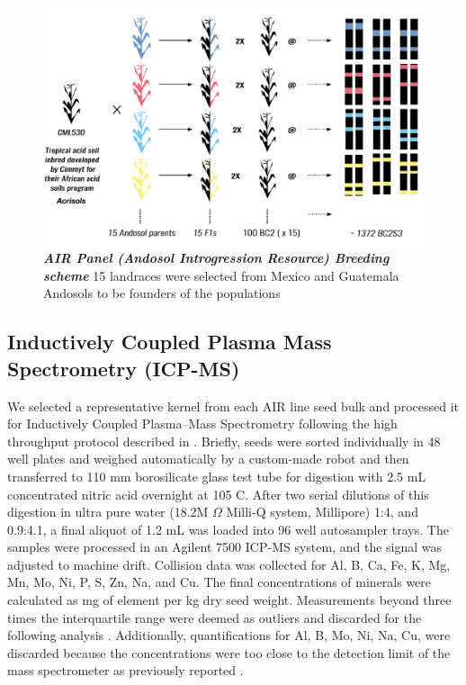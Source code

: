 \begin{figure}[!ht]
\includegraphics[width=\linewidth]{Chapter-4/figs/AIR_design.png}
\caption[ AIR Panel (Andosol Introgression Resource) Breeding scheme]
{\textit{{\textbf{AIR Panel (Andosol Introgression Resource) Breeding scheme}}}
15 landraces were selected from Mexico and Guatemala Andosols to be founders of the populations}
\label{fig::airdesign}
\end{figure}


\subsection{Inductively Coupled Plasma Mass Spectrometry (ICP-MS)}
We selected a representative kernel from each AIR line seed bulk and 
processed it for Inductively Coupled Plasma–Mass Spectrometry following the high throughput protocol described in \citep{baxter2014}.
Briefly, seeds were sorted individually in 48 well plates and weighed automatically by a custom-made robot and then transferred to 110 mm borosilicate glass test tube for digestion with 2.5 mL concentrated nitric acid overnight at 105 \textdegree C. 
After two serial dilutions of this digestion in ultra pure water (18.2M $\Omega$  Milli-Q system, Millipore) 1:4, and 0.9:4.1, a final aliquot of 1.2 mL was loaded into 96 well autosampler trays.
The samples were processed in an Agilent 7500 ICP-MS system, and the signal was adjusted to machine drift.
Collision data was collected for Al, B, Ca, Fe, K, Mg, Mn, Mo, Ni, P, S, Zn, Na, and Cu. 
The final concentrations of minerals were calculated as mg of element per kg dry seed weight.
Measurements beyond three times the interquartile range were deemed as outliers and discarded for the following analysis \citep{baxter2013}.
Additionally, quantifications for Al, B, Mo, Ni, Na, Cu, were discarded because the concentrations were too close to the detection limit of the mass spectrometer as previously reported \citep{baxter2013}.


